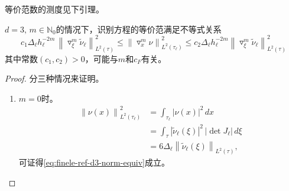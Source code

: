 等价范数的测度见下引理。
\begin{lemma}[识别方程等价范的测度(d=3)]
  \label{lemma:finele-ref-d3-norm-equiv}
  $d=3,\,m\in \mathbb{N}_{0}$的情况下，识别方程的等价范满足不等式关系
  \begin{equation}
    \label{eq:finele-ref-d3-norm-equiv}
    c_{1} \Delta_{\ell} h_{\ell}^{- 2 m} \,
    \left\|
    \triangledown_{\xi}^{m} \widetilde{\nu}_{\ell}
    \right\|_{L^{2}(\tau)}^{2}
    \le \left\| \triangledown_{x}^{m} \nu
    \right\|_{L^{2}(\tau_{\ell})}^{2}
    \le c_{2} \Delta_{\ell} h_{\ell}^{- 2 m}
    \left\|
    \triangledown_{\xi}^{m} \widetilde{\nu}_{\ell}
    \right\|_{L^{2}(\tau)}^{2}
  \end{equation}
  其中常数$(c_{1}, c_{2}) > 0$，可能与$m$和$c_{F}$有关。
\end{lemma}
\begin{proof}
  分三种情况来证明。
\begin{enumerate}
  \item $m=0$时。
  \begin{equation*}
    \begin{split}
      \left\| \nu(x) \right\|_{L^{2}(\tau_{\ell})}^{2}
      & = \int_{\tau_{\ell}} \left| \nu(x) \right|^{2} \, d x \\
      & = \int_{\tau}
      \left| \widetilde{\nu}_{\ell}(\xi) \right|^{2} \,
      \left| \det J_{\ell} \right|
      \, d \xi \\
      & = 6 \Delta_{\ell}
      \left\| \widetilde{\nu}_{\ell}(\xi) \right\|_{L^{2}(\tau)},
    \end{split}
  \end{equation*}
可证得\eqref{eq:finele-ref-d3-norm-equiv}成立。


\end{enumerate}
\end{proof}
